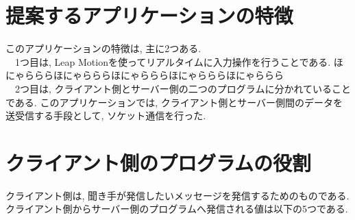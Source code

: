 \documentclass{funthesis}
\begin{document}
\section{提案するアプリケーションの特徴}

このアプリケーションの特徴は, 主に2つある.\\
　1つ目は, Leap Motionを使ってリアルタイムに入力操作を行うことである. ほにゃらららほにゃらららほにゃらららほにゃらららほにゃららら\\
　2つ目は, クライアント側とサーバー側の二つのプログラムに分かれていることである. このアプリケーションでは, クライアント側とサーバー側間のデータを送受信する手段として, ソケット通信を行った. 


\section{クライアント側のプログラムの役割}
クライアント側は, 聞き手が発信したいメッセージを発信するためのものである. クライアント側からサーバー側のプログラムへ発信される値は以下の5つである. 
\end{document}

